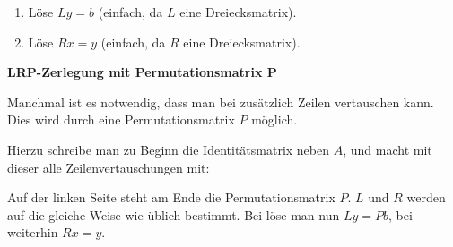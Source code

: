 {\begin{enumerate}[label=\protect\circled{\arabic*}]
\item Löse $Ly = b$ (einfach, da $L$ eine Dreiecksmatrix).
\item Löse $Rx = y$ (einfach, da $R$ eine Dreiecksmatrix).
\end{enumerate}
\vskip5pt

\textbf{LRP-Zerlegung mit Permutationsmatrix P}

\vspace{5pt}
\begin{center}
\end{center}
\vspace{2pt}

Manchmal ist es notwendig, dass man bei  zusätzlich Zeilen vertauschen kann. Dies wird durch eine Permutationsmatrix $P$ möglich. \par
Hierzu schreibe man zu Beginn die Identitätsmatrix neben $A$, und macht mit dieser alle Zeilenvertauschungen mit:

\vspace{3pt}
\begin{center}  \end{center}
\vspace{3pt}

Auf der linken Seite steht am Ende die Permutationsmatrix $P$. $L$ und $R$ werden auf die gleiche Weise wie üblich bestimmt. Bei  löse man nun $Ly = Pb$, bei  weiterhin $Rx = y$. \par
}
\newpage